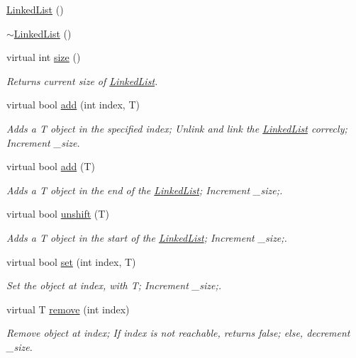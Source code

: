 \begin{DoxyCompactItemize}
\item 
\hyperlink{classLinkedList_a3c20fcfec867e867f541061a09fc640c}{Linked\-List} ()
\item 
\hyperlink{classLinkedList_a7c37609df3b83bc4eb0281b852f93fd7}{$\sim$\-Linked\-List} ()
\item 
virtual int \hyperlink{classLinkedList_ab8388ea027c2de8125f5d1e5901c2b2e}{size} ()
\begin{DoxyCompactList}\small\item\em Returns current size of \hyperlink{classLinkedList}{Linked\-List}. \end{DoxyCompactList}\item 
virtual bool \hyperlink{classLinkedList_a3307f9b9ecf90a18c270b3b6bc7a7e04}{add} (int index, T)
\begin{DoxyCompactList}\small\item\em Adds a T object in the specified index; Unlink and link the \hyperlink{classLinkedList}{Linked\-List} correcly; Increment \-\_\-size. \end{DoxyCompactList}\item 
virtual bool \hyperlink{classLinkedList_a9c3c4f3f527bde2e1572a43f3fb26ea3}{add} (T)
\begin{DoxyCompactList}\small\item\em Adds a T object in the end of the \hyperlink{classLinkedList}{Linked\-List}; Increment \-\_\-size;. \end{DoxyCompactList}\item 
virtual bool \hyperlink{classLinkedList_a55ba7f61737011f2b684d59154543e6e}{unshift} (T)
\begin{DoxyCompactList}\small\item\em Adds a T object in the start of the \hyperlink{classLinkedList}{Linked\-List}; Increment \-\_\-size;. \end{DoxyCompactList}\item 
virtual bool \hyperlink{classLinkedList_a08ce5b6527cefbd221324569fdb10969}{set} (int index, T)
\begin{DoxyCompactList}\small\item\em Set the object at index, with T; Increment \-\_\-size;. \end{DoxyCompactList}\item 
virtual T \hyperlink{classLinkedList_af331637727b3ada2f806c29b9f4cc6fe}{remove} (int index)
\begin{DoxyCompactList}\small\item\em Remove object at index; If index is not reachable, returns false; else, decrement \-\_\-size. \end{DoxyCompactList}\item 

\end{DoxyCompactItemize}
